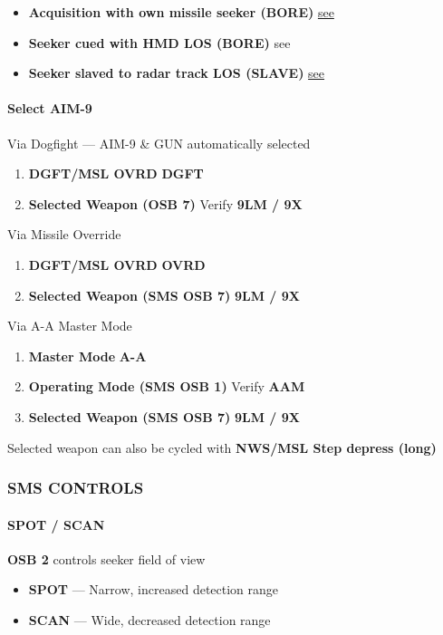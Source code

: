 \begin{itemize}
    \item \textbf{Acquisition with own missile seeker (BORE)}
    \hfill\hyperref[subsec:aim9:bore]{see }
    \item \textbf{Seeker cued with HMD LOS (BORE)}
    \hfill{see }
    \item \textbf{Seeker slaved to radar track LOS (SLAVE)}
    \hfill\hyperref[subsec:aim9:slave]{see }
\end{itemize}

\clearpage

\paragraph{Select AIM-9}
Via Dogfight --- AIM-9 \& GUN automatically selected

\begin{enumerate}
    \item \textbf{DGFT/MSL OVRD} \dotfill \textbf{DGFT}
    \item \textbf{Selected Weapon (OSB 7)} \dotfill Verify \textbf{9LM / 9X}
\end{enumerate}

Via Missile Override
\begin{enumerate}
    \item \textbf{DGFT/MSL OVRD} \dotfill \textbf{OVRD}
    \item \textbf{Selected Weapon (SMS OSB 7)} \dotfill \textbf{9LM / 9X}
\end{enumerate}

Via A-A Master Mode
\begin{enumerate}
    \item \textbf{Master Mode} \dotfill \textbf{A-A}
    \item \textbf{Operating Mode (SMS OSB 1)} \dotfill Verify \textbf{AAM}
    \item \textbf{Selected Weapon (SMS OSB 7)} \dotfill \textbf{9LM / 9X}
\end{enumerate}

Selected weapon can also be cycled with \textbf{NWS/MSL Step depress (long)}
    
\subsubsection{SMS CONTROLS}

\paragraph{SPOT / SCAN}
\textbf{OSB 2} controls seeker field of view
\begin{itemize}
    \item \textbf{SPOT} --- Narrow, increased detection range
    \item \textbf{SCAN} --- Wide, decreased detection range
\end{itemize}

